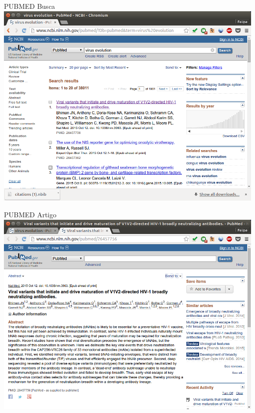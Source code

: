 \documentclass{beamer}
\begin{document}
\begin{frame}{PUBMED Busca}
  \includegraphics[height=.85\textheight]{Busca/pubmed-busca}
\end{frame}

\begin{frame}{PUBMED Artigo}
  \includegraphics[height=.85\textheight]{Busca/pubmed-paper}
\end{frame}
\end{document}
